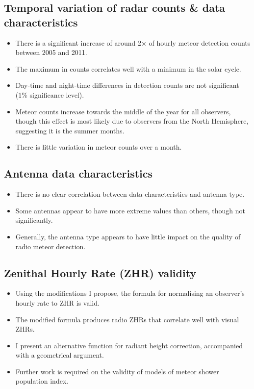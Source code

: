 \subsection{Temporal variation of radar counts \& data characteristics}
\begin{itemize}
	\item There is a significant increase of around 2$\times$ of hourly meteor detection counts between 2005 and 2011.
	\item The maximum in counts correlates well with a minimum in the solar cycle.
	\item Day-time and night-time differences in detection counts are not significant (1\% significance level).
	\item Meteor counts increase towards the middle of the year for all observers, though this effect is most likely due to observers from the North Hemisphere, suggesting it is the summer months.
	\item There is little variation in meteor counts over a month.
\end{itemize}
\subsection{Antenna data characteristics}
\begin{itemize}
	\item There is no clear correlation between data characteristics and antenna type.
	\item Some antennas appear to have more extreme values than others, though not significantly.
	\item Generally, the antenna type appears to have little impact on the quality of radio meteor detection.
\end{itemize}
\subsection{Zenithal Hourly Rate (ZHR) validity}
\begin{itemize}
	\item Using the modifications I propose, the formula for normalising an observer's hourly rate to ZHR is valid.
	\item The modified formula produces radio ZHRs that correlate well with visual ZHRs.
	\item I present an alternative function for radiant height correction, accompanied with a geometrical argument.
	\item Further work is required on the validity of models of meteor shower population index.
\end{itemize}
